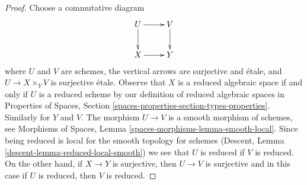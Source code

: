\documentclass[10pt,a4paper]{amsart}
\theoremstyle{plain}
\theoremstyle{definition}
\theoremstyle{remark}
\numberwithin{equation}{subsection}
\begin{document}
\begin{proof}
Choose a commutative diagram
$$
\xymatrix{
U \ar[d] \ar[r] & V \ar[d] \\
X \ar[r] & Y
}
$$
where $U$ and $V$ are schemes, the vertical arrows are surjective and
\'etale, and $U \to X \times_Y V$ is surjective \'etale. Observe that $X$ is
a reduced algebraic space if and only if $U$ is a reduced scheme
by our definition of reduced algebraic spaces in
Properties of Spaces, Section \ref{spaces-properties-section-types-properties}.
Similarly for $Y$ and $V$. 
The morphism $U \to V$ is a smooth morphism of schemes, see
Morphisms of Spaces, Lemma \ref{spaces-morphisms-lemma-smooth-local}.
Since being reduced is local for the smooth topology for
schemes (Descent, Lemma \ref{descent-lemma-reduced-local-smooth})
we see that $U$ is reduced if $V$ is reduced.
On the other hand, if $X \to Y$ is surjective, then $U \to V$ is
surjective and in this case if $U$ is reduced, then $V$ is reduced.
\end{proof}
\end{document}
